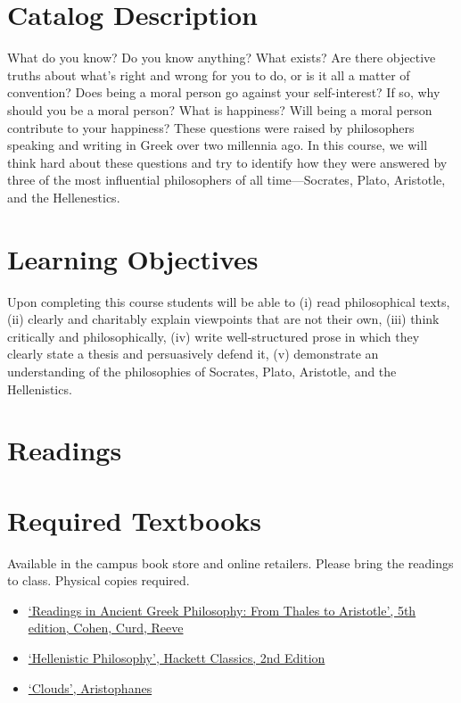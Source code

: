 \documentclass[article,oneside]{memoir}
\begin{document}
\section{Catalog Description}

What do you know? Do you know anything? What exists? Are there objective truths about what’s right and wrong for you to do, or is it all a matter of convention? Does being a moral person go against your self-interest? If so, why should you be a moral person? What is happiness? Will being a moral person contribute to your happiness? These questions were raised by philosophers speaking and writing in Greek over two millennia ago. In this course, we will think hard about these questions and try to identify how they were answered by three of the most influential philosophers of all time---Socrates, Plato, Aristotle, and the Hellenestics. 

\section{Learning Objectives}

Upon completing this course students will be able to (i) read
philosophical texts, (ii) clearly and charitably explain viewpoints that
are not their own, (iii) think critically and philosophically, (iv)
write well-structured prose in which they clearly state a thesis and
persuasively defend it, (v) demonstrate an understanding of the
philosophies of Socrates, Plato, Aristotle, and the Hellenistics.


\section{Readings}
\section{Required Textbooks}

Available in the campus book store and online retailers. Please bring the readings to class. Physical copies required.
\begin{itemize}
\item \href{https://www.amazon.com/Readings-Ancient-Greek-Philosophy-Aristotle/dp/1624665322/ref=dp_ob_title_bk}{`Readings in Ancient Greek Philosophy: From Thales to Aristotle', 5th edition, Cohen, Curd, Reeve}
\item \href{http://www.amazon.com/Hellenistic-Philosophy-Hackett-Classics-Inwood/dp/0872203786/ref=sr_1_1?ie=UTF8&qid=1452099186&sr=8-1&keywords=hellenistic+philosophy}{`Hellenistic Philosophy', Hackett Classics, 2nd Edition}
\item \href{https://www.amazon.com/Clouds-Aristophanes/dp/0872205169/ref=sr_1_2?s=books&ie=UTF8&qid=1515009741&sr=1-2&keywords=aristophanes+clouds}{`Clouds', Aristophanes}

\end{itemize}
\end{document}
